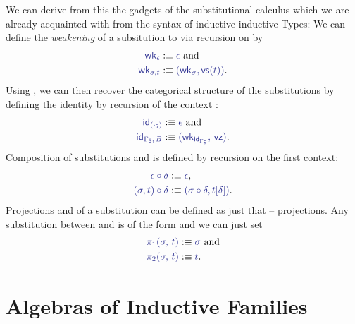 \begin{defn}
We can derive from this the gadgets of the substitutional calculus which we
are already acquainted with from the syntax of inductive-inductive Types:
We can define the \emph{weakening} of a subsitution
\tqm{\IFSub{\sigma}{\Gamma_\Sc}{\Delta_\Sc}} to 
 via recursion on \tqm{\sigma} by
\begin{align*}
\tqm{\wk_\epsilon} 				&:\equiv \tqm{\epsilon} \text{ and} \\
\tqm{\wk_{\sigma, t}}				&:\equiv \tqm{(\wk_\sigma, \vs(t))} \text{.}
\end{align*}
Using \tqm{\wk}, we can then recover the categorical structure of the substitutions
by defining the identity \tqm{\IFSub{\id_{\Gamma_\Sc}}{\Gamma_\Sc}{\Gamma_\Sc}}
by recursion of the context \tqm{\Gamma_\Sc}:
\begin{align*}
\tqm{\id_{(\cdot_\Sc)}}				&:\equiv \tqm{\epsilon} \text{ and} \\
\tqm{\id_{\Gamma_\Sc,\, B}}			&:\equiv \tqm{(\wk_{\id_{\Gamma_\Sc}},\, \vz)} \text{.}
\end{align*}
Composition \tqm{\IFSub{\sigma \circ \delta}{\Gamma_\Sc}{\Sigma_\Sc}} of substitutions
\tqm{\IFSub{\sigma}{\Delta_\Sc}{\Sigma_\Sc}} and \tqm{\IFSub{\delta}{\Gamma_\Sc}{\Delta_\Sc}}
is defined by recursion on the first context:
\begin{align*}
\tqm{\epsilon \circ \delta}			&:\equiv \tqm{\epsilon} \text{,} \\
\tqm{(\sigma, t) \circ \delta}			&:\equiv \tqm{(\sigma \circ \delta, t[\delta])} \text{.}
\end{align*}
Projections  and
 of a substitution
 can be defined as just that --
projections.
Any substitution between \tqm{\Gamma_\Sc} and  is of the form
 and we can just set
\begin{align*}
\tqm{\pi_1(\sigma,\, t)}				&:\equiv \tqm{\sigma} \text{ and} \\
\tqm{\pi_2(\sigma,\, t)}				&:\equiv \tqm{t} \text{.}
\end{align*}
\end{defn}


\section{Algebras of Inductive Families}\label{sec:if-alg}

